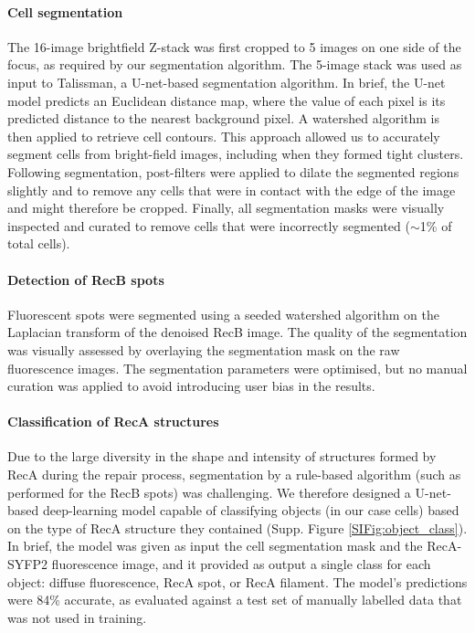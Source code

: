 \paragraph{Cell segmentation}
The 16-image brightfield Z-stack was first cropped to 5 images on one side of the focus, as required by our segmentation algorithm. The 5-image stack was used as input to Talissman, a U-net-based segmentation algorithm. In brief, the U-net model predicts an Euclidean distance map, where the value of each pixel is its predicted distance to the nearest background pixel. A watershed algorithm is then applied to retrieve cell contours. This approach allowed us to accurately segment cells from bright-field images, including when they formed tight clusters. Following segmentation, post-filters were applied to dilate the segmented regions slightly and to remove any cells that were in contact with the edge of the image and might therefore be cropped. Finally, all segmentation masks were visually inspected and curated to remove cells that were incorrectly segmented ($\sim$1\% of total cells).

\paragraph*{Detection of RecB spots}
Fluorescent spots were segmented using a seeded watershed algorithm on the Laplacian transform of the denoised RecB image. The quality of the segmentation was visually assessed by overlaying the segmentation mask on the raw fluorescence images. The segmentation parameters were optimised, but no manual curation was applied to avoid introducing user bias in the results.

\paragraph*{Classification of RecA structures}
Due to the large diversity in the shape and intensity of structures formed by RecA during the repair process, segmentation by a rule-based algorithm (such as performed for the RecB spots) was challenging. We therefore designed a U-net-based deep-learning model capable of classifying objects (in our case cells) based on the type of RecA structure they contained (Supp. Figure \ref{SIFig:object_class}). In brief, the model was given as input the cell segmentation mask and the RecA-SYFP2 fluorescence image, and it provided as output a single class for each object: diffuse fluorescence, RecA spot, or RecA filament. The model's predictions were 84\% accurate, as evaluated against a test set of manually labelled data that was not used in training.

